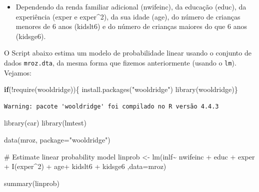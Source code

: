 \documentclass[
  letterpaper,
  DIV=11,
  numbers=noendperiod]{scrreprt}
\newenvironment{Shaded}{\begin{snugshade}}{\end{snugshade}}
\newcommand{\AttributeTok}[1]{\textcolor[rgb]{0.40,0.45,0.13}{#1}}
\newcommand{\CommentTok}[1]{\textcolor[rgb]{0.37,0.37,0.37}{#1}}
\newcommand{\ControlFlowTok}[1]{\textcolor[rgb]{0.00,0.23,0.31}{\textbf{#1}}}
\newcommand{\DecValTok}[1]{\textcolor[rgb]{0.68,0.00,0.00}{#1}}
\newcommand{\FunctionTok}[1]{\textcolor[rgb]{0.28,0.35,0.67}{#1}}
\newcommand{\NormalTok}[1]{\textcolor[rgb]{0.00,0.23,0.31}{#1}}
\newcommand{\OtherTok}[1]{\textcolor[rgb]{0.00,0.23,0.31}{#1}}
\newcommand{\SpecialCharTok}[1]{\textcolor[rgb]{0.37,0.37,0.37}{#1}}
\newcommand{\StringTok}[1]{\textcolor[rgb]{0.13,0.47,0.30}{#1}}
\providecommand{\tightlist}{%
  \setlength{\itemsep}{0pt}\setlength{\parskip}{0pt}}
\begin{document}
\begin{itemize}
\tightlist
\item
  Dependendo da renda familiar adicional (nwifeinc), da educação (educ),
  da experiência (exper e exper\^{}2), da sua idade (age), do número de
  crianças menores de 6 anos (kidslt6) e do número de crianças maiores
  do que 6 anos (kidsge6).
\end{itemize}

O Script abaixo estima um modelo de probabilidade linear usando o
conjunto de dados \texttt{mroz.dta}, da mesma forma que fizemos
anteriormente (usando o \texttt{lm}). Vejamos:

\begin{Shaded}
\begin{Highlighting}[]
\ControlFlowTok{if}\NormalTok{(}\SpecialCharTok{!}\FunctionTok{require}\NormalTok{(wooldridge))\{}
    \FunctionTok{install.packages}\NormalTok{(}\StringTok{"wooldridge"}\NormalTok{)}
    \FunctionTok{library}\NormalTok{(wooldridge)\}}
\end{Highlighting}
\end{Shaded}

\begin{verbatim}
Warning: pacote 'wooldridge' foi compilado no R versão 4.4.3
\end{verbatim}

\begin{Shaded}
\begin{Highlighting}[]
\FunctionTok{library}\NormalTok{(car)}
\FunctionTok{library}\NormalTok{(lmtest)}

\FunctionTok{data}\NormalTok{(mroz, }\AttributeTok{package=}\StringTok{"wooldridge"}\NormalTok{)}

\CommentTok{\# Estimate linear probability model}
\NormalTok{linprob }\OtherTok{\textless{}{-}} \FunctionTok{lm}\NormalTok{(inlf}\SpecialCharTok{\textasciitilde{}}\NormalTok{ nwifeinc }\SpecialCharTok{+}\NormalTok{ educ }\SpecialCharTok{+}\NormalTok{ exper }\SpecialCharTok{+} \FunctionTok{I}\NormalTok{(exper}\SpecialCharTok{\^{}}\DecValTok{2}\NormalTok{) }\SpecialCharTok{+} 
\NormalTok{                  age}\SpecialCharTok{+}\NormalTok{ kidslt6 }\SpecialCharTok{+}\NormalTok{ kidsge6 ,}\AttributeTok{data=}\NormalTok{mroz)}

\FunctionTok{summary}\NormalTok{(linprob)}
\end{Highlighting}
\end{Shaded}
\end{document}
